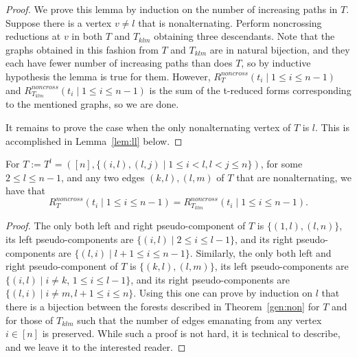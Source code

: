 \documentclass[ALCO,ThmDefs]{cedram}
\numberwithin{equation}{section}
\newcommand*\+{\smash{\lower2pt\hbox{\rlap{\vrule height14pt}}\raise2pt\hbox{\rlap{\hskip-3pt \vrule height.4pt depth0pt width14.7pt}}}}
\begin{document}
\begin{proof}
We prove this lemma by induction on the number of increasing paths in $T$. Suppose there is a vertex $v\neq l$ that is nonalternating. Perform noncrossing reductions at $v$ in both $T$ and $T_{klm}$ obtaining three descendants. Note that the graphs obtained in this fashion from $T$ and $T_{klm}$ are in natural bijection, and they each have fewer number of increasing paths than does $T$, so by inductive hypothesis the lemma is true for them. However, $R^{noncross}_T(t_i \mid 1\leq i\leq n-1)$ and $R^{noncross}_{T_{klm}}(t_i \mid 1\leq i\leq n-1)$ is the sum of the t-reduced forms corresponding to the mentioned graphs, so we are done.

It remains to prove the case when the only nonalternating vertex of $T$ is $l$. This is accomplished in Lemma~\ref{lem:ll} below.
\end{proof}

\begin{lemm}\label{lem:ll}
For $T:=T^l=([n], \{(i,l), (l, j) \mid 1\leq i<l, l<j\leq n\})$, for some $2\leq l\leq n-1$, and any two edges $(k,l), (l,m)$ of $T$ that are nonalternating, we have that
\begin{equation}\label{eq:noncrossbis}
R^{noncross}_T(t_i \mid 1\leq i\leq n-1)=R^{noncross}_{T_{klm}}(t_{i} \mid 1\leq i\leq n-1).
\end{equation}
\end{lemm}

\begin{proof}
The only both left and right pseudo-component of $T$ is $\{(1,l), (l, n)\}$, its left pseudo-components are $\{(i,l) \mid 2\leq i\leq l-1\}$, and its right pseudo-components are $\{(l,i) \mid l+1\leq i\leq n-1\}$. Similarly, the only both left and right pseudo-component of $T$ is $\{(k,l), (l, m)\}$, its left pseudo-components are $\{(i,l)\mid i \neq k$, $1\leq i\leq l-1\}$, and its right pseudo-components are $\{(l,i)\mid i\neq m, l+1\leq i\leq n\}$. Using this one can prove by induction on $l$ that there is a bijection between the forests described in Theorem~\ref{gen:non} for $T$ and for those of $T_{klm}$ such that the number of edges emanating from any vertex $i \in [n]$ is preserved. While such a proof is not hard, it is technical to describe, and we leave it to the interested reader.
\end{proof}
\end{document}
